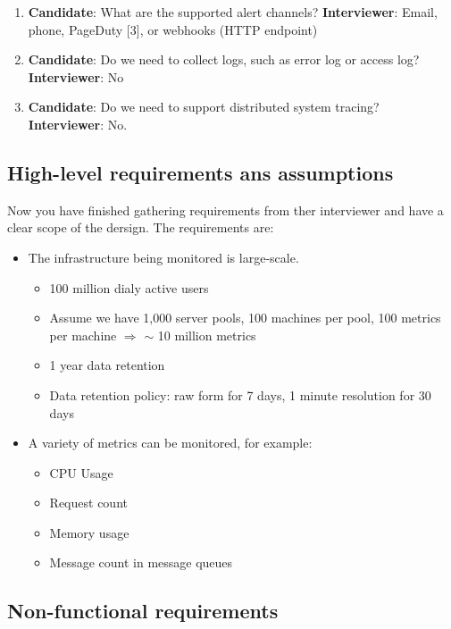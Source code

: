 \documentclass{report}
\theoremstyle{definition}
\let\oldsubsection\subsection
\renewcommand{\subsection}{\oldsubsection*}
\begin{document}
\begin{enumerate}
\item
\textbf{Candidate}: What are the supported alert channels?
\textbf{Interviewer}: Email, phone, PageDuty [3], or webhooks (HTTP endpoint)

\item
\textbf{Candidate}: Do we need to collect logs, such as error log or access log?
\textbf{Interviewer}: No

\item
\textbf{Candidate}: Do we need to support distributed system tracing?
\textbf{Interviewer}: No.
\end{enumerate}

\subsection{High-level requirements ans assumptions}

Now you have finished gathering requirements from ther interviewer and have a clear scope of the dersign. The requirements are:

\begin{itemize}
\item
The infrastructure being monitored is large-scale.

\begin{itemize}
\item
100 million dialy active users
\item
Assume we have 1,000 server pools, 100 machines per pool, 100 metrics per machine $\Rightarrow$ $\sim$ 10 million metrics
\item
1 year data retention
\item
Data retention policy: raw form for 7 days, 1 minute resolution for 30 days
\end{itemize}

\item
A variety of metrics can be monitored, for example:

\begin{itemize}
\item
CPU Usage
\item
Request count
\item
Memory usage
\item
Message count in message queues
\end{itemize}

\end{itemize}

\subsection{Non-functional requirements}
\end{document}
